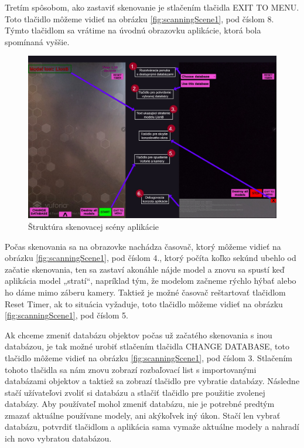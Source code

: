 Tretím spôsobom, ako zastaviť skenovanie je stlačením tlačidla EXIT TO MENU. Toto tlačidlo môžeme vidieť na obrázku \ref{fig:scanningScene1}, pod číslom 8. Týmto tlačidlom sa vrátime na úvodnú obrazovku aplikácie, ktorá bola spomínaná vyššie. 

\begin{figure}[!h]
  \centering
  \includegraphics[width=1\textwidth]{img/Scanning_scene_part2Collapse.jpg}
  \caption{Štruktúra skenovacej scény aplikácie}
  \label{fig:scanningScene2}
\end{figure}

Počas skenovania sa na obrazovke nachádza časovač, ktorý môžeme vidieť na obrázku \ref{fig:scanningScene1}, pod číslom 4., ktorý počíta koľko sekúnd ubehlo od začatie skenovania, ten sa zastaví akonáhle nájde model a znovu sa spustí keď aplikácia model „stratí“, napríklad tým, že modelom začneme rýchlo hýbať alebo ho dáme mimo záberu kamery. Taktiež je možné časovač reštartovať tlačidlom Reset Timer, ak to situácia vyžaduje, toto tlačidlo môžeme vidieť na obrázku \ref{fig:scanningScene1}, pod číslom 5. 

Ak chceme zmeniť databázu objektov počas už začatého skenovania s inou databázou, je tak možné urobiť stlačením tlačidla CHANGE DATABASE, toto tlačidlo môžeme vidieť na obrázku \ref{fig:scanningScene1}, pod číslom 3. Stlačením tohoto tlačidla sa nám znovu zobrazí rozbaľovací list s importovanými databázami objektov a taktiež sa zobrazí tlačidlo pre vybratie databázy. Následne stačí užívateľovi zvoliť si databázu a stlačiť tlačidlo pre použitie zvolenej databázy. Aby používateľ mohol zmeniť databázu, nie je potrebné predtým zmazať aktuálne používane modely, ani akýkoľvek iný úkon. Stačí len vybrať databázu, potvrdiť tlačidlom a aplikácia sama vymaže aktuálne modely a nahradí ich novo vybratou databázou.

